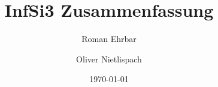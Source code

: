 \documentclass[10pt,a4paper]{article}
\title{InfSi3 Zusammenfassung}
\author{
	Roman Ehrbar\\
	\and
	Oliver Nietlispach
	}
\date{\today}
\begin{document}
\maketitle
\tableofcontents
\listoftodos
\newpage 






















\end{document}
